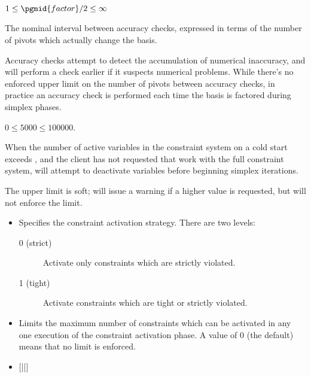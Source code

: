 \begin{codedoc}
  $1 \leq \pgmid{factor}/2 \leq \infty$

  The nominal interval between accuracy checks, expressed in terms of the
  number of pivots which actually change the basis.

  Accuracy checks attempt to detect the accumulation of numerical inaccuracy,
  and \dylp will perform a check earlier if it suspects numerical problems.
  While there's no enforced upper limit on the number of pivots between
  accuracy checks, in practice an accuracy check is performed each time the
  basis is factored during simplex phases.

  \item{}
    \kw{;}

  $0 \leq 5000 \leq 100000$.

  When the number of active variables in the constraint system on a cold start
  exceeds , and the client has not requested that \dylp work
  with the full constraint system, \dylp will attempt to deactivate
  variables before beginning simplex iterations.

  The upper limit is soft; \dylp will issue a warning if a higher value is
  requested, but will not enforce the limit.

  \item{}
  \begin{itemize}
    \item[\pgmid{con.actlvl}]
      \kw{;}

    Specifies the constraint activation strategy.
    There are two levels:
    \begin{description}
      \item[0 (strict)] Activate only constraints which are strictly
	violated.

      \item[1 (tight)] Activate constraints which are tight or strictly
	violated.
    \end{description}

    \item[\pgmid{con.actlim}]
      \kw{;}

    Limits the maximum number of constraints which can be activated in any
    one execution of the constraint activation phase.
    A value of 0 (the default) means that no limit is enforced.

    \item[\pgmid{con.deactlvl}]
	[||] \kw{;}


\end{itemize}
\end{codedoc}
